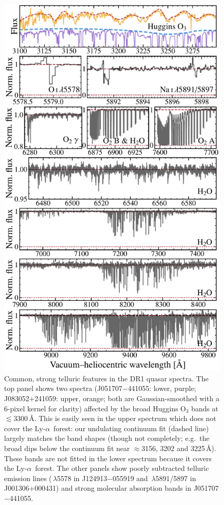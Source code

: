 \documentclass[fleqn,usenatbib,usedcolumn]{mnras}
\renewcommand{\la}{\lesssim} %
\newcommand{\lya}{\ensuremath{\textrm{Ly-}\alpha}}
\begin{document}
\begin{figure}
\begin{center}
\includegraphics[width=0.95\columnwidth]{DR1_telluric.pdf}
\vspace{-1em}
\caption{Common, strong telluric features in the DR1 quasar spectra. The top panel shows two spectra (J051707$-$441055: lower, purple; J083052$+$241059: upper, orange; both are Gaussian-smoothed with a 6-pixel kernel for clarity) affected by the broad Huggins O$_3$ bands at $\la$3300\,\AA. This is easily seen in the upper spectrum which does not cover the \lya\ forest: our undulating continuum fit (dashed line) largely matches the band shapes (though not completely; e.g.\ the broad dips below the continuum fit near $\approx$3156, 3202 and 3225\,\AA). These bands are not fitted in the lower spectrum because it covers the \lya\ forest. The other panels show poorly subtracted telluric emission lines (\,$\lambda$5578 in J124913$-$055919 and \,$\lambda$5891/5897 in J001306$+$000431) and strong molecular absorption bands in J051707$-$441055.}
\label{f:telluric}
\end{center}
\end{figure}
\end{document}
